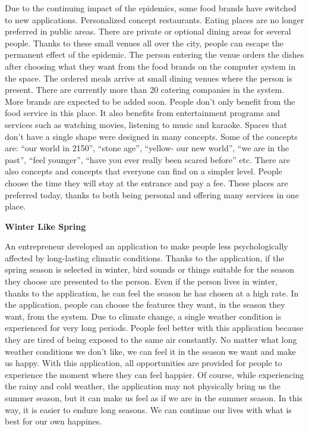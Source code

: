 \documentclass[]{book}
\begin{document}
Due to the continuing impact of the epidemics, some food brands have switched to new applications. Personalized concept restaurants. Eating places are no longer preferred in public areas. There are private or optional dining areas for several people. Thanks to these small venues all over the city, people can escape the permanent effect of the epidemic. The person entering the venue orders the dishes after choosing what they want from the food brands on the computer system in the space. The ordered meals arrive at small dining venues where the person is present. There are currently more than 20 catering companies in the system. More brands are expected to be added soon. People don't only benefit from the food service in this place. It also benefits from entertainment programs and services such as watching movies, listening to music and karaoke. Spaces that don't have a single shape were designed in many concepts. Some of the concepts are: ``our world in 2150'', ``stone age'', ``yellow- our new world'', ``we are in the past'', ``feel younger'', ``have you ever really been scared before'' etc. There are also concepts and concepts that everyone can find on a simpler level. People choose the time they will stay at the entrance and pay a fee. These places are preferred today, thanks to both being personal and offering many services in one place.

\textbf{Winter Like Spring}

An entrepreneur developed an application to make people less psychologically affected by long-lasting climatic conditions. Thanks to the application, if the spring season is selected in winter, bird sounds or things suitable for the season they choose are presented to the person. Even if the person lives in winter, thanks to the application, he can feel the season he has chosen at a high rate. In the application, people can choose the features they want, in the season they want, from the system. Due to climate change, a single weather condition is experienced for very long periods. People feel better with this application because they are tired of being exposed to the same air constantly. No matter what long weather conditions we don't like, we can feel it in the season we want and make us happy. With this application, all opportunities are provided for people to experience the moment where they can feel happier. Of course, while experiencing the rainy and cold weather, the application may not physically bring us the summer season, but it can make us feel as if we are in the summer season. In this way, it is easier to endure long seasons. We can continue our lives with what is best for our own happines.
\end{document}
